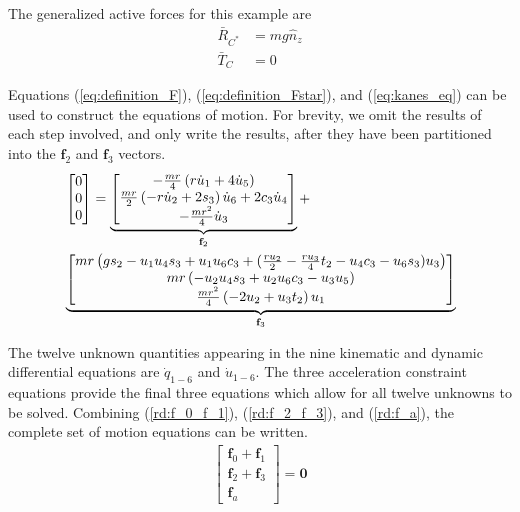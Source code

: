 \documentclass[smallcondensed,final]{svjour3}                     %
\begin{document}
The generalized active forces for this example are
\begin{align}
    \bar{R}_{C^*} &= m g \hat{n}_z \\
    \bar{T}_C &= 0
\end{align}

Equations (\ref{eq:definition_F}), (\ref{eq:definition_Fstar}), and
(\ref{eq:kanes_eq}) can be used to construct the equations of motion.
For brevity, we omit the results of each step involved, and only write the
results, after they have been partitioned into the $\mathbf{f}_2$ and
$\mathbf{f}_3$ vectors.
\begin{align}
    \label{rd:f_2_f_3}
    & \left[\begin{matrix} 0\\ 0\\ 0\end{matrix}\right] =
    \underbrace{\left[\begin{matrix}- \frac{m r}{4} \left(r \dot{u}_{1} + 4
                \dot{u}_{5}\right)\\\frac{m r}{2} \left(- r \dot{u}_{2} + 2
                s_3\right) \dot{u}_{6} + 2 c_3
                \dot{u}_{4}\\- \frac{m r^{2}}{4}
                \dot{u}_{3}\end{matrix}\right]}_{\mathbf{f}_2} + \notag\\
    &\underbrace{\left[\begin{matrix}
                m r \left( g s_2 - u_1 u_4 s_3 + u_1 u_6 c_3
                    + (\frac{r u_2}{2} - \frac{r u_3}{4} t_2 - u_4
                c_3 - u_6 s_3) u_3 \right)
                \\m r \left(- u_{2} u_{4}
                s_3 + u_{2} u_{6}
                c_3 - u_{3} u_{5}\right)\\\frac{m r^{2}}{4}
                \left(- 2 u_{2} + u_{3} t_2\right)
                u_{1}\end{matrix}\right]}_{\mathbf{f}_3} 
\end{align}

The twelve unknown quantities appearing in the nine kinematic and dynamic
differential equations are $\dot{q}_{1-6}$ and $\dot{u}_{1-6}$. The three
acceleration constraint equations provide the final three equations which allow
for all twelve unknowns to be solved. Combining (\ref{rd:f_0_f_1}),
(\ref{rd:f_2_f_3}), and (\ref{rd:f_a}), the complete set of motion equations
can be written.
\begin{align}
\label{rd:ode}
\begin{bmatrix} \mathbf{f}_0 + \mathbf{f}_1\\
                \mathbf{f}_2 + \mathbf{f}_3\\
                \mathbf{f}_a \end{bmatrix} = \mathbf{0}
\end{align}
\end{document}
